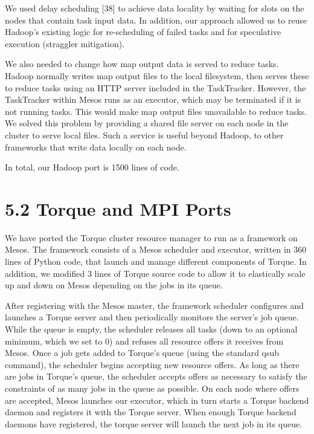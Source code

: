 \documentclass[
]{article}
\begin{document}
We used delay scheduling {[}38{]} to achieve data locality by waiting
for slots on the nodes that contain task input data. In addition, our
approach allowed us to reuse Hadoop's existing logic for re-scheduling
of failed tasks and for speculative execution (straggler mitigation).

We also needed to change how map output data is served to reduce tasks.
Hadoop normally writes map output files to the local filesystem, then
serves these to reduce tasks using an HTTP server included in the
TaskTracker. However, the TaskTracker within Mesos runs as an executor,
which may be terminated if it is not running tasks. This would make map
output files unavailable to reduce tasks. We solved this problem by
providing a shared file server on each node in the cluster to serve
local files. Such a service is useful beyond Hadoop, to other frameworks
that write data locally on each node.

In total, our Hadoop port is 1500 lines of code.

\section{5.2 Torque and MPI Ports}\label{torque-and-mpi-ports}

We have ported the Torque cluster resource manager to run as a framework
on Mesos. The framework consists of a Mesos scheduler and executor,
written in 360 lines of Python code, that launch and manage different
components of Torque. In addition, we modified 3 lines of Torque source
code to allow it to elastically scale up and down on Mesos depending on
the jobs in its queue.

After registering with the Mesos master, the framework scheduler
configures and launches a Torque server and then periodically monitors
the server's job queue. While the queue is empty, the scheduler releases
all tasks (down to an optional minimum, which we set to 0) and refuses
all resource offers it receives from Mesos. Once a job gets added to
Torque's queue (using the standard qsub command), the scheduler begins
accepting new resource offers. As long as there are jobs in Torque's
queue, the scheduler accepts offers as necessary to satisfy the
constraints of as many jobs in the queue as possible. On each node where
offers are accepted, Mesos launches our executor, which in turn starts a
Torque backend daemon and registers it with the Torque server. When
enough Torque backend daemons have registered, the torque server will
launch the next job in its queue.
\end{document}
